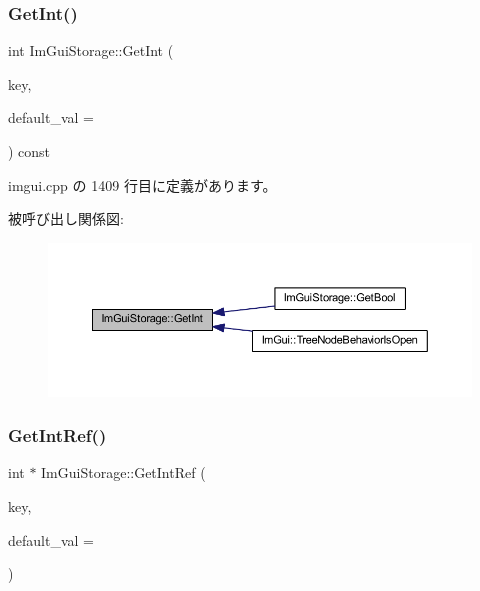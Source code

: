 \subsubsection{\texorpdfstring{Get\+Int()}{GetInt()}}
{\footnotesize\ttfamily int Im\+Gui\+Storage\+::\+Get\+Int (\begin{DoxyParamCaption}\item[{\mbox{\hyperlink{imgui_8h_a1785c9b6f4e16406764a85f32582236f}{Im\+Gui\+ID}}}]{key,  }\item[{int}]{default\+\_\+val = {} }\end{DoxyParamCaption}) const}



 imgui.\+cpp の 1409 行目に定義があります。

被呼び出し関係図\+:\nopagebreak
\begin{figure}[H]
\begin{center}
\leavevmode
\includegraphics[width=350pt]{struct_im_gui_storage_ac86b64f5c69a15de6c6c326963eca64a_icgraph}
\end{center}
\end{figure}
\mbox{\label{struct_im_gui_storage_a28673fa7839263f3066ccb8e93e748a9}} 
\subsubsection{\texorpdfstring{Get\+Int\+Ref()}{GetIntRef()}}
{\footnotesize\ttfamily int $\ast$ Im\+Gui\+Storage\+::\+Get\+Int\+Ref (\begin{DoxyParamCaption}\item[{\mbox{\hyperlink{imgui_8h_a1785c9b6f4e16406764a85f32582236f}{Im\+Gui\+ID}}}]{key,  }\item[{int}]{default\+\_\+val = {} }\end{DoxyParamCaption})}



